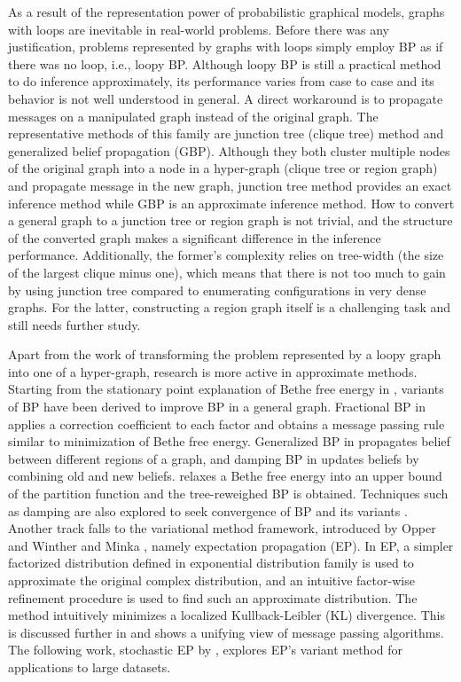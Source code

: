 As a result of the representation power of probabilistic graphical models, graphs with loops are inevitable in real-world problems. Before there was any justification, problems represented by graphs with loops simply employ BP as if there was no loop, i.e., loopy BP.  Although loopy BP is still a practical method to do inference approximately, its performance varies from case to case and its behavior is not well understood in general. A direct workaround is to propagate messages on a manipulated graph instead of the original graph. The representative methods of this family are junction tree (clique tree) method \cite[Section~10]{koller2009pgm} and generalized belief propagation (GBP)\cite{yedida2005constucting}. Although they both cluster multiple nodes of the original graph into a node in a hyper-graph (clique tree or region graph) and propagate message in the new graph, junction tree method provides an exact inference method while GBP is an approximate inference method. How to convert a general graph to a junction tree or region graph is not trivial, and the structure of the converted graph makes a significant difference in the inference performance. Additionally, the former's complexity relies on tree-width (the size of the largest clique minus one), which means that there is not too much to gain by using junction tree compared to enumerating configurations in very dense graphs. For the latter, constructing a region graph itself is a challenging task and still needs further study.


Apart from the work of transforming the problem represented by a loopy graph into one of a hyper-graph, research is more active in approximate methods. Starting from the stationary point explanation of Bethe free energy in \cite{Yedidia:2000:GBP:3008751.3008848}, variants of BP have been derived to improve BP in a general graph. Fractional BP in \cite{Wiegerinck:2002:FBP:2968618.2968673} applies a correction coefficient to each factor and obtains a message passing rule similar to minimization of Bethe free energy. 
Generalized BP in \cite{Yedidia:2000:GBP:3008751.3008848} propagates belief between different regions of a graph, and damping BP in \cite{Pretti2005damping} updates beliefs by combining old and new beliefs. \cite{wainwright2008graphical} relaxes a Bethe free energy into an upper bound of the partition function and the tree-reweighed BP is obtained. Techniques such as damping are also explored to seek convergence of BP and its variants \cite{Pretti2005damping}.
Another track falls to the variational method framework, introduced by Opper and Winther \cite{Opper:2000:GPC:1121900.1121911} and Minka \cite{Minka:2001:EPA:647235.720257, Minka:2001:FAA:935427}, namely expectation propagation (EP). In EP, a simpler factorized distribution defined in exponential distribution family is used to approximate the original complex distribution, and an intuitive factor-wise refinement procedure is used to find such an approximate distribution. The method intuitively minimizes a localized Kullback-Leibler (KL) divergence. This is discussed further in \cite{divergence-measures-and-message-passing} and shows a unifying view of message passing algorithms. The following work, stochastic EP by \cite{yingzhen2015sep}, explores EP's variant method for applications to large datasets.

